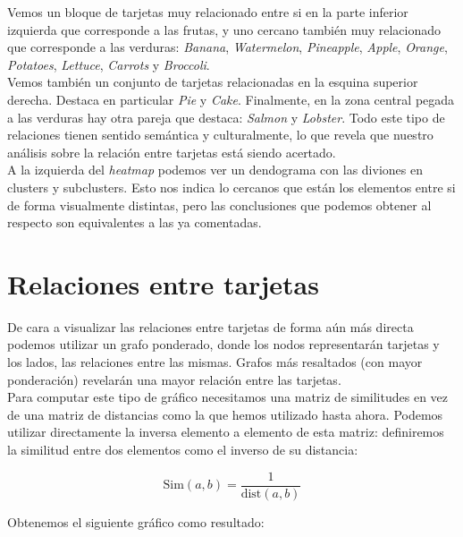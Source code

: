 \documentclass[a4paper]{article}
\begin{document}
Vemos un bloque de tarjetas muy relacionado entre si en la parte inferior izquierda que corresponde a las frutas, y uno cercano también muy relacionado que corresponde a las verduras: \emph{Banana}, \emph{Watermelon}, \emph{Pineapple}, \emph{Apple}, \emph{Orange}, \emph{Potatoes}, \emph{Lettuce}, \emph{Carrots} y \emph{Broccoli}. \\

Vemos también un conjunto de tarjetas relacionadas en la esquina superior derecha. Destaca en particular \emph{Pie} y \emph{Cake}. Finalmente, en la zona central pegada a las verduras hay otra pareja que destaca: \emph{Salmon} y \emph{Lobster}. Todo este tipo de relaciones tienen sentido semántica y culturalmente, lo que revela que nuestro análisis sobre la relación entre tarjetas está siendo acertado. \\

A la izquierda del \emph{heatmap} podemos ver un dendograma con las diviones en clusters y subclusters. Esto nos indica lo cercanos que están los elementos entre si de forma visualmente distintas, pero las conclusiones que podemos obtener al respecto son equivalentes a las ya comentadas. \\

\section{Relaciones entre tarjetas}

De cara a visualizar las relaciones entre tarjetas de forma aún más directa podemos utilizar un grafo ponderado, donde los nodos representarán tarjetas y los lados, las relaciones entre las mismas. Grafos más resaltados (con mayor ponderación) revelarán una mayor relación entre las tarjetas. \\

Para computar este tipo de gráfico necesitamos una matriz de similitudes en vez de una matriz de distancias como la que hemos utilizado hasta ahora. Podemos utilizar directamente la inversa elemento a elemento de esta matriz: definiremos la similitud entre dos elementos como el inverso de su distancia:

\[
	\text{Sim}(a,b) = \frac{1}{\text{dist}(a,b)}
\]

Obtenemos el siguiente gráfico como resultado:
\end{document}
